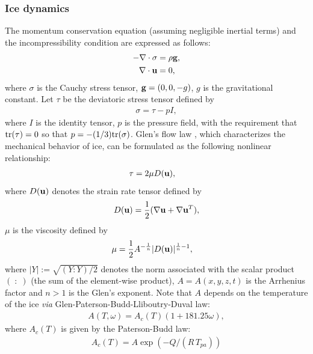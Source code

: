 \documentclass[10pt,twocolumn]{article}
\begin{document}
\subsubsection{Ice dynamics}
\label{phys_ice_dynamics}
 
The momentum conservation equation (assuming negligible inertial terms) and the 
incompressibility condition are expressed as follows:
\begin{align}
- \nabla \cdot \sigma  & =  \rho  {\bf g},  \label{eq_conservation}  \\
\nabla \cdot {\bf u}  & = 0,                   \label{eq_incomp} 
\end{align}  
where $\sigma$ is the Cauchy stress tensor, ${\bf g}= (0,0,-g)$, $g$ is the gravitational constant.
Let $\tau$ be the deviatoric stress tensor defined by 
\begin{align}
\sigma = \tau  -  p I , \label{eq_dev}  
\end{align}  
where $I$ is the identity tensor, $p$ is the pressure field, 
with the requirement that ${\rm tr} (\tau) = 0 $ so that 
$p = -(1/3) {\rm tr} (\sigma)$. Glen's flow law \citep{Glen1953}, 
which characterizes the mechanical behavior of ice, can be formulated 
as the following nonlinear relationship:
\begin{align} 
\tau & = 2 \mu {D} ({\bf u}), \label{eq_tau} 
\end{align}  
where ${D} ({\bf u})$ denotes the strain rate tensor defined by 
\begin{align} 
{D} ({\bf u}) = \frac12 ( \nabla {\bf u} +  \nabla {\bf u}^T ),
\label{def_varepsilon}  
\end{align} 
$\mu$ is the viscosity defined by 
\begin{align}  
\mu & = \frac12  A^{-\frac{1}{n}} | D ({\bf u}) |^{\frac{1}{n}-1},
\label{eq_mu}  
\end{align} 
where $ |Y|  := \sqrt{(Y : Y) / 2 }$ denotes the norm associated with the scalar product 
$(\; : \;)$ (the sum of the element-wise product), $A=A(x,y,z,t)$ is the Arrhenius factor 
and $n>1$ is the Glen's exponent.
Note that $A$ depends on the temperature of the ice \citep{Paterson1994}
\textit{via} Glen-Paterson-Budd-Lliboutry-Duval law:
\begin{align}
A(T,\omega)= A_c(T)(1+181.25 \omega), \label{defA}
\end{align}
where $A_c(T)$ is given by the Paterson-Budd law:
\begin{align}
A_c(T)= A \exp{ ( -Q / (R \, T_{pa}) )}
\end{align}
\end{document}
